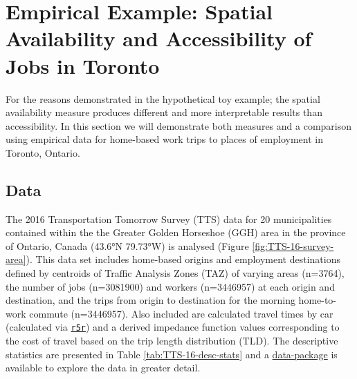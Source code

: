 \documentclass[]{elsarticle} %
\begin{document}
\hypertarget{empirical-example-spatial-availability-and-accessibility-of-jobs-in-toronto}{%
\section{Empirical Example: Spatial Availability and Accessibility of
Jobs in
Toronto}\label{empirical-example-spatial-availability-and-accessibility-of-jobs-in-toronto}}

For the reasons demonstrated in the hypothetical toy example; the
spatial availability measure produces different and more interpretable
results than accessibility. In this section we will demonstrate both
measures and a comparison using empirical data for home-based work trips
to places of employment in Toronto, Ontario.

\hypertarget{data}{%
\subsection{Data}\label{data}}

The 2016 Transportation Tomorrow Survey (TTS) data for 20 municipalities
contained within the the Greater Golden Horseshoe (GGH) area in the
province of Ontario, Canada (43.6°N 79.73°W) is analysed (Figure
\ref{fig:TTS-16-survey-area}). This data set includes home-based origins
and employment destinations defined by centroids of Traffic Analysis
Zones (TAZ) of varying areas (n=3764), the number of jobs (n=3081900)
and workers (n=3446957) at each origin and destination, and the trips
from origin to destination for the morning home-to-work commute
(n=3446957). Also included are calculated travel times by car
(calculated via \href{https://github.com/ipeaGIT/r5r}{\texttt{r5r}}) and
a derived impedance function values corresponding to the cost of travel
based on the trip length distribution (TLD). The descriptive statistics
are presented in Table \ref{tab:TTS-16-desc-stats} and a
\href{https://github.com/soukhova/AccessPack}{data-package} is available
to explore the data in greater detail.
\end{document}
